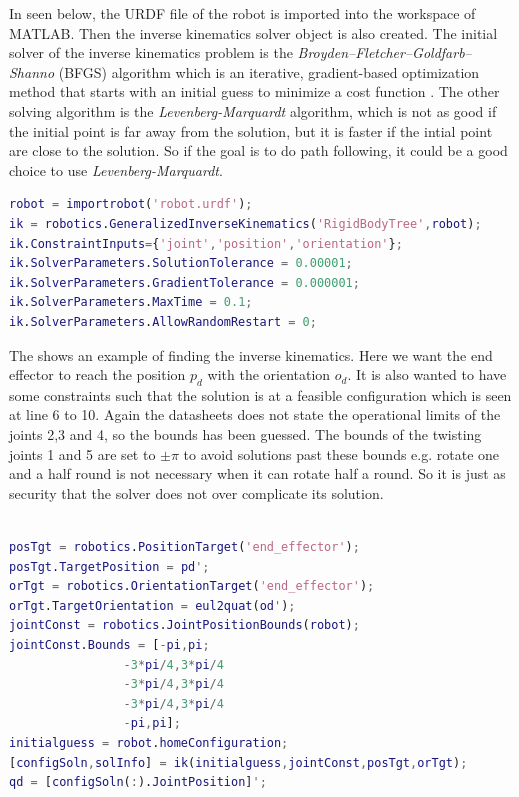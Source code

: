 In  seen below, the URDF file of the robot is imported into the workspace of MATLAB. Then the inverse kinematics solver object is also created. The initial solver of the inverse kinematics problem is the \textit{Broyden–Fletcher–Goldfarb–Shanno} (BFGS) algorithm which is an iterative, gradient-based optimization method that starts with an initial guess to minimize a cost function \cite{MatlabRobTool}. The other solving algorithm is the \textit{Levenberg-Marquardt} algorithm, which is not as good if the initial point is far away from the solution, but it is faster if the intial point are close to the solution. So if the goal is to do path following, it could be a good choice to use \textit{Levenberg-Marquardt}\cite{MatlabRobTool}. 
\begin{lstlisting}[caption={MATLAB code of creating and specifying an inverse kinematics object},label={lst:robotinit},language=Matlab]
robot = importrobot('robot.urdf');
ik = robotics.GeneralizedInverseKinematics('RigidBodyTree',robot);
ik.ConstraintInputs={'joint','position','orientation'};
ik.SolverParameters.SolutionTolerance = 0.00001;
ik.SolverParameters.GradientTolerance = 0.000001;
ik.SolverParameters.MaxTime = 0.1;
ik.SolverParameters.AllowRandomRestart = 0;
\end{lstlisting}
The  shows an example of finding the inverse kinematics. Here we want the end effector to reach the position $p_d$ with the orientation $o_d$. It is also wanted to have some constraints such that the solution is at a feasible configuration which is seen at line 6 to 10. Again the datasheets does not state the operational limits of the joints 2,3 and 4, so the bounds has been guessed. The bounds of the twisting joints 1 and 5 are set to $\pm \pi$ to avoid solutions past these bounds e.g. rotate one and a half round is not necessary when it can rotate half a round. So it is just as security that the solver does not over complicate its solution. \\\\
\begin{lstlisting}[caption={MATLAB code for specifying $p_d$, $o_d$ and joint bounds which is used to find a solution of the inverse kinematics problem},label={lst:gik},language=Matlab]
posTgt = robotics.PositionTarget('end_effector');
posTgt.TargetPosition = pd';
orTgt = robotics.OrientationTarget('end_effector');
orTgt.TargetOrientation = eul2quat(od');
jointConst = robotics.JointPositionBounds(robot);
jointConst.Bounds = [-pi,pi;
                -3*pi/4,3*pi/4
                -3*pi/4,3*pi/4
                -3*pi/4,3*pi/4
                -pi,pi];
initialguess = robot.homeConfiguration;
[configSoln,solInfo] = ik(initialguess,jointConst,posTgt,orTgt);
qd = [configSoln(:).JointPosition]';
\end{lstlisting}
